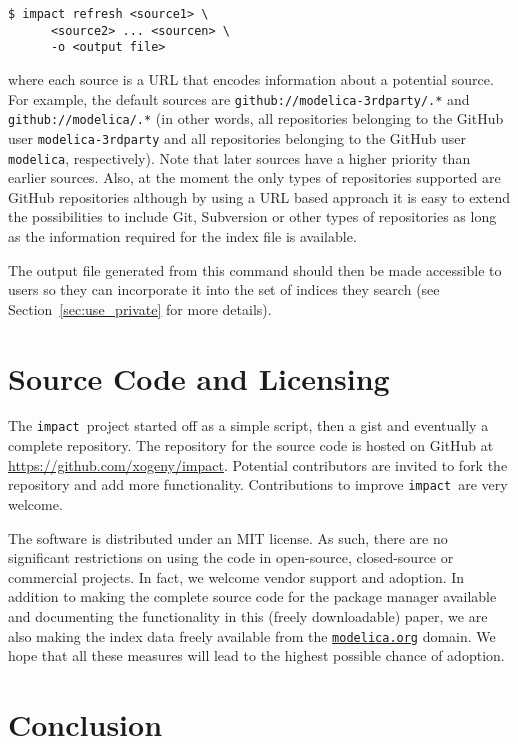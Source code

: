 \documentclass[11pt,a4paper,twocolumn]{article}
\newcommand{\impact}{\texttt{impact}} %
\newcommand{\code}[1]{\texttt{#1}} %
\begin{document}
\begin{verbatim}
$ impact refresh <source1> \
      <source2> ... <sourcen> \
      -o <output file>
\end{verbatim}

where each source is a URL that encodes information about a potential
source.  For example, the default sources are
\code{github://modelica-3rdparty/.*} and \code{github://modelica/.*}
(in other words, all repositories belonging to the GitHub user
\code{modelica-3rdparty} and all repositories belonging to the GitHub
user \code{modelica}, respectively).  Note that later sources have a
higher priority than earlier sources.  Also, at the moment the only
types of repositories supported are GitHub repositories although by
using a URL based approach it is easy to extend the possibilities to
include Git, Subversion or other types of repositories as long as the
information required for the index file is available.

The output file generated from this command should then be made
accessible to users so they can incorporate it into the set of indices
they search (see Section~\ref{sec:use_private} for more details).

\section{Source Code and Licensing}
\label{sec:source}

The \impact\ project started off as a simple script, then a gist and
eventually a complete repository.  The repository for the source code
is hosted on GitHub at \url{https://github.com/xogeny/impact}.
Potential contributors are invited to fork the repository and add more
functionality.  Contributions to improve \impact\ are very welcome.

The software is distributed under an MIT license.  As such, there are
no significant restrictions on using the code in open-source,
closed-source or commercial projects.  In fact, we welcome vendor
support and adoption.  In addition to making the complete source code
for the package manager available and documenting the functionality
in this (freely downloadable) paper, we are also making the index data
freely available from the \href{https://modelica.org}{\code{modelica.org}}
domain.  We hope that all these measures will lead to the highest possible
chance of adoption.

\section{Conclusion}
\label{sec:conclusion}
\end{document}
